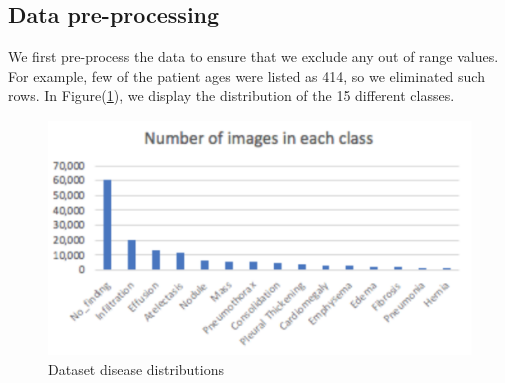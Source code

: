 \documentclass[10pt,letterpaper]{article}
\begin{document}
\subsection{Data pre-processing}
We first pre-process the data to ensure that we exclude any out of range values. For example, few of the patient ages were listed as 414, so we eliminated such rows. In Figure(\ref{class_distributions}), we display the distribution of the 15 different classes. 
\begin{figure}[htb]
	\centering
	\includegraphics[width=\linewidth]{./imagedistribution.png}
	\caption{Dataset disease distributions}
	\label{class_distributions}
\end{figure}
\newline 
\end{document}
